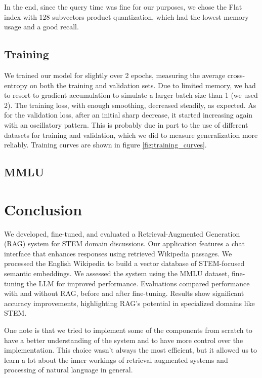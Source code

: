 \documentclass[11pt]{article}
\begin{document}
In the end, since the query time was fine for our purposes, we chose the Flat index with 128
subvectors product quantization, which had the lowest memory usage and a good recall.

\subsection{Training}

We trained our model for slightly over 2 epochs, measuring the average cross-entropy on both the training and validation sets.
Due to limited memory, we had to resort to gradient accumulation to simulate a larger batch size than 1 (we used 2). The training loss, 
with enough smoothing, decreased steadily, as expected. As for the validation loss, after an initial sharp decrease, it started increasing
again with an oscillatory pattern. This is probably due in part to the use of different datasets for training and validation, which we did
to measure generalization more reliably. Training curves are shown in figure \ref{fig:training_curves}.

\subsection{MMLU}



\section{Conclusion}
We developed, fine-tuned, and evaluated a Retrieval-Augmented Generation (RAG) 
system for STEM domain discussions. Our application features a chat interface 
that enhances responses using retrieved Wikipedia passages. We processed the 
English Wikipedia to build a vector database of STEM-focused semantic 
embeddings. 
We assessed the system using the MMLU 
dataset, fine-tuning the LLM for improved performance. Evaluations compared 
performance with and without RAG, before and after fine-tuning.
Results show significant accuracy improvements, highlighting RAG's potential 
in specialized domains like STEM.

One note is that we tried to implement some of the components from scratch
to have a better understanding of the system and to have more control over the
implementation.
This choice wasn't always the most efficient, but it allowed us to learn a lot
about the inner workings of retrieval augmented systems and processing of natural 
language in general. 
\end{document}
